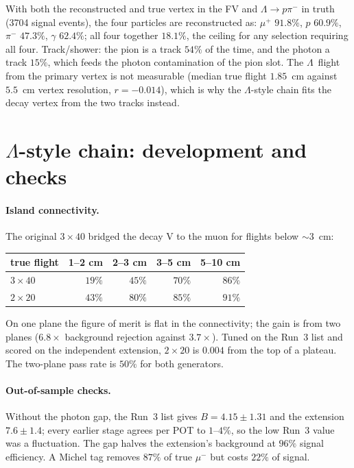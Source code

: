 \documentclass[11pt,a4paper]{article}
\newcommand{\Lam}{\ensuremath{\Lambda}}
\begin{document}
With both the reconstructed and true vertex in the FV and $\Lam\to p\pi^-$ in truth
(3704 signal events), the four particles are reconstructed as: $\mu^+$ $91.8\%$, $p$
$60.9\%$, $\pi^-$ $47.3\%$, $\gamma$ $62.4\%$; all four together $18.1\%$, the ceiling for
any selection requiring all four. Track/shower: the pion is a track $54\%$ of the time,
and the photon a track $15\%$, which feeds the photon contamination of the pion slot.
The \Lam\ flight from the primary vertex is not measurable (median true flight $1.85$~cm
against $5.5$~cm vertex resolution, $r=-0.014$), which is why the \Lam-style chain fits
the decay vertex from the two tracks instead.

\section{\Lam-style chain: development and checks}
\label{app:ls}

\paragraph{Island connectivity.} The original $3\times40$ bridged the decay V to the muon
for flights below $\sim3$~cm:
\begin{center}
\begin{tabular}{lrrrr}
\toprule
true flight & 1--2 cm & 2--3 cm & 3--5 cm & 5--10 cm \\
\midrule
$3\times40$ & $19\%$ & $45\%$ & $70\%$ & $86\%$ \\
$2\times20$ & $43\%$ & $80\%$ & $85\%$ & $91\%$ \\
\bottomrule
\end{tabular}
\end{center}
On one plane the figure of merit is flat in the connectivity; the gain is from two planes
($6.8\times$ background rejection against $3.7\times$). Tuned on the Run~3 list and scored
on the independent extension, $2\times20$ is $0.004$ from the top of a plateau. The
two-plane pass rate is $50\%$ for both generators.

\paragraph{Out-of-sample checks.} Without the photon gap, the Run~3 list gives $B=4.15\pm
1.31$ and the extension $7.6\pm1.4$; every earlier stage agrees per POT to $1$--$4\%$, so
the low Run~3 value was a fluctuation. The gap halves the extension's background at $96\%$
signal efficiency. A Michel tag removes $87\%$ of true $\mu^-$ but costs $22\%$ of signal.
\end{document}
